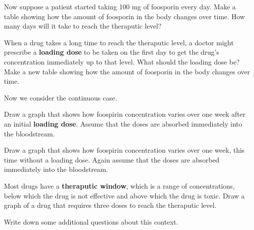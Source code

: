 \documentclass{ximera}
\begin{document}
\begin{question}
Now suppose a patient started taking 100 mg of foosporin every day.  Make a table showing how the amount of foosporin in the body changes over time.  How many days will it take to reach the theraputic level?  
\begin{freeResponse}
\end{freeResponse}
\end{question}

\begin{question}
When a drug takes a long time to reach the theraputic level, a doctor might prescribe a \textbf{loading dose} to be taken on the first day to get the drug's concentration immediately up to that level.  What should the loading dose be?  Make a new table showing how the amount of foosporin in the body changes over time.  
\begin{freeResponse}
\end{freeResponse}
\end{question}

Now we consider the continuous case.  
\begin{question}
Draw a graph that shows how foospirin concentration varies over one week after an initial \textbf{loading dose}.  Assume that the doses are absorbed immediately into the bloodstream.  
\begin{freeResponse}
\end{freeResponse}
\end{question}

\begin{question}
Draw a graph that shows how foospirin concentration varies over one week, this time without a loading dose.  Again assume that the doses are absorbed immediately into the bloodstream.  
\begin{freeResponse}
\end{freeResponse}
\end{question}

\begin{question}
Most drugs have a \textbf{theraputic window}, which is a range of concentrations, below which the drug is not effective and above which the drug is toxic.  Draw a graph of a drug that requires three doses to reach the theraputic level.  
\begin{freeResponse}
\end{freeResponse}
\end{question}

\begin{question}
Write down some additional questions about this context.       
\begin{freeResponse}
\end{freeResponse}
\end{question}
\end{document}
